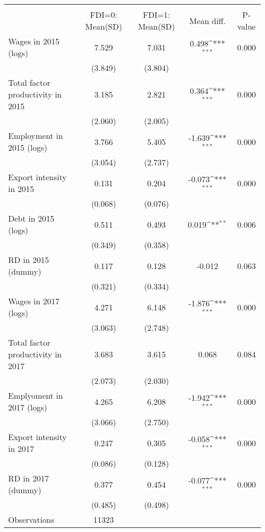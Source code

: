 {
\def\sym#1{\ifmmode^{#1}\else\(^{#1}\)\fi}
\begin{tabular}{l*{1}{cccc}}
\hline\hline
                    &\multicolumn{4}{c}{}                                        \\
                    &FDI=0: Mean(SD)&FDI=1: Mean(SD)&  Mean diff.         &     P-value\\
\hline
Wages in 2015 (logs)&       7.529&       7.031&       0.498\sym{***}&       0.000\\
                    &     (3.849)&     (3.804)&                     &            \\
Total factor productivity in 2015&       3.185&       2.821&       0.364\sym{***}&       0.000\\
                    &     (2.060)&     (2.005)&                     &            \\
Employment in 2015 (logs)&       3.766&       5.405&      -1.639\sym{***}&       0.000\\
                    &     (3.054)&     (2.737)&                     &            \\
Export intensity in 2015&       0.131&       0.204&      -0.073\sym{***}&       0.000\\
                    &     (0.068)&     (0.076)&                     &            \\
Debt in 2015 (logs) &       0.511&       0.493&       0.019\sym{**} &       0.006\\
                    &     (0.349)&     (0.358)&                     &            \\
RD in 2015 (dummy)  &       0.117&       0.128&      -0.012         &       0.063\\
                    &     (0.321)&     (0.334)&                     &            \\
Wages in 2017 (logs)&       4.271&       6.148&      -1.876\sym{***}&       0.000\\
                    &     (3.063)&     (2.748)&                     &            \\
Total factor productivity in 2017&       3.683&       3.615&       0.068         &       0.084\\
                    &     (2.073)&     (2.030)&                     &            \\
Emplyoment in 2017 (logs)&       4.265&       6.208&      -1.942\sym{***}&       0.000\\
                    &     (3.066)&     (2.750)&                     &            \\
Export intensity in 2017&       0.247&       0.305&      -0.058\sym{***}&       0.000\\
                    &     (0.086)&     (0.128)&                     &            \\
RD in 2017 (dummy)  &       0.377&       0.454&      -0.077\sym{***}&       0.000\\
                    &     (0.485)&     (0.498)&                     &            \\
\hline
Observations        &       11323&            &                     &            \\
\hline\hline
\end{tabular}
}
